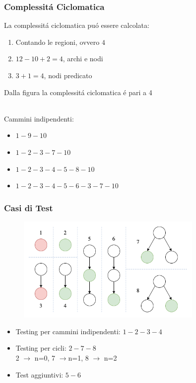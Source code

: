 \begin{frame}
    \frametitle{Complessitá Ciclomatica}
    La complessitá ciclomatica puó essere calcolata:
    \begin{enumerate}
        \item Contando le regioni, ovvero $4$
        \item $12-10+2=4$, archi e nodi
        \item $3+1=4$, nodi predicato
    \end{enumerate}
    Dalla figura la complessitá ciclomatica é pari a 4

    \\
    Cammini indipendenti:
    \begin{itemize}
        \item $1-9-10$
        \item $1-2-3-7-10$
        \item $1-2-3-4-5-8-10$
        \item $1-2-3-4-5-6-3-7-10$
    \end{itemize}
\end{frame}

\begin{frame}
    \frametitle{Casi di Test}
    \begin{figure}
        \includegraphics[width=0.8\textwidth]{img/casiTestWhiteBox.png}
    \end{figure}
    \begin{itemize}
        \item Testing per cammini indipendenti: $1-2-3-4$
        \item Testing per cicli: $2-7-8$ \\
            2 $\to$ n=0, 7 $\to $n=1, 8 $\to$ n=2
        \item Test aggiuntivi: $5-6$
    \end{itemize}
\end{frame}

